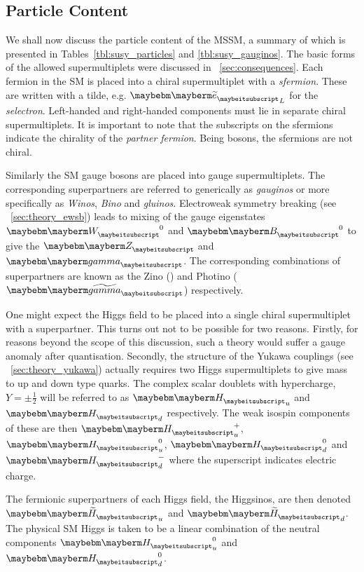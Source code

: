 \subsection{Particle Content}
We shall now discuss the particle content of the \ac{MSSM}, a summary of which
is presented in Tables~\ref{tbl:susy_particles} and \ref{tbl:susy_gauginos}. The
basic forms of the allowed supermultiplets were discussed in
\sec~\ref{sec:consequences}. Each fermion in the \ac{SM} is placed into a chiral
supermultiplet with a \spinzero \emph{sfermion}. These are written with a tilde,
e.g. $\PSe_L$ for the \emph{selectron}. Left-handed and right-handed components
must lie in separate chiral supermultiplets. It is important to note that the
subscripts on the sfermions indicate the chirality of the \emph{partner
  fermion}. Being \spinzero bosons, the sfermions are not chiral.

Similarly the \ac{SM} gauge bosons are placed into gauge supermultiplets. The
corresponding superpartners are referred to generically as \emph{gauginos} or more
specifically as \emph{Winos}, \emph{Bino} and \emph{gluinos}. Electroweak symmetry
breaking (see \sec~\ref{sec:theory_ewsb}) leads to mixing of the gauge
eigenstates $\PW^0$ and $\PB^0$ to give the $\PZ$ and $\Pphoton$. The corresponding
combinations of superpartners are known as the Zino (\PSZ) and Photino
($\PSphotino$) respectively.

One might expect the Higgs field to be placed into a single chiral
supermultiplet with a \spinhalf superpartner. This turns out not to be possible
for two reasons. Firstly, for reasons beyond the scope of this discussion, such
a theory would suffer a gauge anomaly after quantisation. Secondly, the
structure of the Yukawa couplings (see \sec~\ref{sec:theory_yukawa}) actually
requires two Higgs supermultiplets to give mass to up and down type quarks. The
complex scalar doublets with hypercharge, $Y=\pm\frac{1}{2}$ will be referred to
as $\PHiggs_u$ and $\PHiggs_d$ respectively. The weak isospin components of
these are then $\PHiggs_u^+$, $\PHiggs_u^0$, $\PHiggs_d^0$ and $\PHiggs_d^-$
where the superscript indicates electric charge.

The fermionic superpartners of each Higgs field, the Higgsinos, are then denoted
$\PSHiggs_u$ and $\PSHiggs_d$. The physical \ac{SM} Higgs is taken to be a
linear combination of the neutral components $\PHiggs_u^0$ and $\PHiggs_d^0$.




